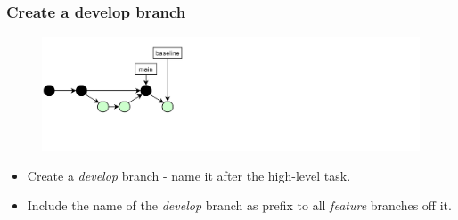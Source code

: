 \documentclass[aspectratio=169]{beamer}
\begin{document}
\begin{frame}
	\frametitle{Create a develop branch}

	\vspace{-.5cm}
	\begin{minipage}[t][5cm][t]{\textwidth}
		\begin{figure}
			\centering
			\includegraphics[width=\textwidth]{./img/dime-gitflow-network-2-1.png}
		\end{figure}
	\end{minipage}

	\vspace{-.5cm}
	\begin{minipage}[t][5cm][t]{\textwidth}
		\begin{itemize}
			\setlength\itemsep{1em}
			\item Create a \textit{develop} branch
			- name it after the high-level task.
			\item Include the name of the \textit{develop} branch as prefix
			to all \textit{feature} branches off it.
		\end{itemize}
	\end{minipage}
\end{frame}
\end{document}
